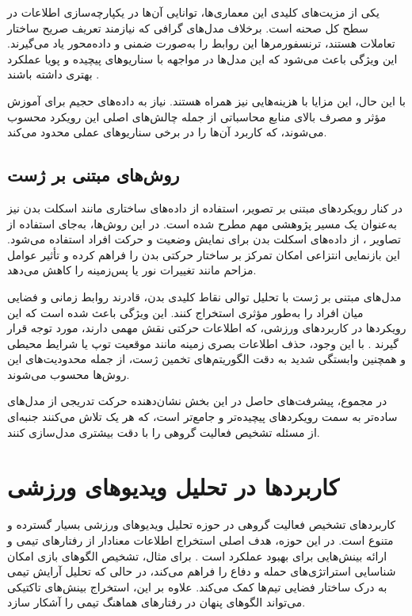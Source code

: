 \documentclass[12pt]{report}
\begin{document}
یکی از مزیت‌های کلیدی این معماری‌ها، توانایی آن‌ها در یکپارچه‌سازی اطلاعات در سطح کل صحنه است. برخلاف مدل‌های گرافی که نیازمند تعریف صریح ساختار تعاملات هستند، ترنسفورمرها این روابط را به‌صورت ضمنی و داده‌محور یاد می‌گیرند. این ویژگی باعث می‌شود که این مدل‌ها در مواجهه با سناریوهای پیچیده و پویا عملکرد بهتری داشته باشند \cite{fourteen}.

با این حال، این مزایا با هزینه‌هایی نیز همراه هستند. نیاز به داده‌های حجیم برای آموزش مؤثر و مصرف بالای منابع محاسباتی از جمله چالش‌های اصلی این رویکرد محسوب می‌شوند، که کاربرد آن‌ها را در برخی سناریوهای عملی محدود می‌کند.

\subsection[روش‌های مبتنی بر ژست]{روش‌های مبتنی بر ژست}
در کنار رویکردهای مبتنی بر تصویر، استفاده از داده‌های ساختاری مانند اسکلت بدن نیز به‌عنوان یک مسیر پژوهشی مهم مطرح شده است. در این روش‌ها، به‌جای استفاده از تصاویر ، از داده‌های اسکلت بدن برای نمایش وضعیت و حرکت افراد استفاده می‌شود. این بازنمایی انتزاعی امکان تمرکز بر ساختار حرکتی بدن را فراهم کرده و تأثیر عوامل مزاحم مانند تغییرات نور یا پس‌زمینه را کاهش می‌دهد.

مدل‌های مبتنی بر ژست با تحلیل توالی نقاط کلیدی بدن، قادرند روابط زمانی و فضایی میان افراد را به‌طور مؤثری استخراج کنند. این ویژگی باعث شده است که این رویکردها در کاربردهای ورزشی، که اطلاعات حرکتی نقش مهمی دارند، مورد توجه قرار گیرند \cite{fifteen}. با این وجود، حذف اطلاعات بصری زمینه مانند موقعیت توپ یا شرایط محیطی و همچنین وابستگی شدید به دقت الگوریتم‌های تخمین ژست، از جمله محدودیت‌های این روش‌ها محسوب می‌شوند.

در مجموع، پیشرفت‌های حاصل در این بخش نشان‌دهنده حرکت تدریجی از مدل‌های ساده‌تر به سمت رویکردهای پیچیده‌تر و جامع‌تر است، که هر یک تلاش می‌کنند جنبه‌ای از مسئله تشخیص فعالیت گروهی را با دقت بیشتری مدل‌سازی کنند.

\section{کاربردها در تحلیل ویدیوهای ورزشی}
کاربردهای تشخیص فعالیت گروهی در حوزه تحلیل ویدیوهای ورزشی بسیار گسترده و متنوع است. در این حوزه، هدف اصلی استخراج اطلاعات معنادار از رفتارهای تیمی و ارائه بینش‌هایی برای بهبود عملکرد است \cite{sixteen,seventeen}. برای مثال، تشخیص الگوهای بازی امکان شناسایی استراتژی‌های حمله و دفاع را فراهم می‌کند، در حالی که تحلیل آرایش تیمی به درک ساختار فضایی تیم‌ها کمک می‌کند. علاوه بر این، استخراج بینش‌های تاکتیکی می‌تواند الگوهای پنهان در رفتارهای هماهنگ تیمی را آشکار سازد.
\end{document}
